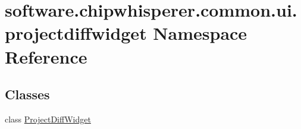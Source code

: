 \hypertarget{namespacesoftware_1_1chipwhisperer_1_1common_1_1ui_1_1projectdiffwidget}{}\section{software.\+chipwhisperer.\+common.\+ui.\+projectdiffwidget Namespace Reference}
\label{namespacesoftware_1_1chipwhisperer_1_1common_1_1ui_1_1projectdiffwidget}
\subsection*{Classes}
\begin{DoxyCompactItemize}
\item 
class \hyperlink{classsoftware_1_1chipwhisperer_1_1common_1_1ui_1_1projectdiffwidget_1_1ProjectDiffWidget}{Project\+Diff\+Widget}
\end{DoxyCompactItemize}
